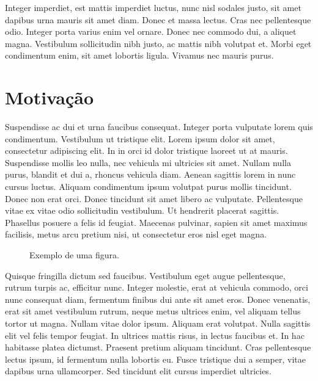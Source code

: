 Integer imperdiet, est mattis imperdiet luctus, nunc nisl sodales justo, sit amet dapibus urna mauris sit amet diam. Donec et massa lectus. Cras nec pellentesque odio. Integer porta varius enim vel ornare. Donec nec commodo dui, a aliquet magna. Vestibulum sollicitudin nibh justo, ac mattis nibh volutpat et. Morbi eget condimentum enim, sit amet lobortis ligula. Vivamus nec mauris purus.

\section{Motivação}


Suspendisse ac dui et urna faucibus consequat. Integer porta vulputate lorem quis condimentum. Vestibulum ut tristique elit. Lorem ipsum dolor sit amet, consectetur adipiscing elit. In in orci id dolor tristique laoreet ut at mauris. Suspendisse mollis leo nulla, nec vehicula mi ultricies sit amet. Nullam nulla purus, blandit et dui a, rhoncus vehicula diam. Aenean sagittis lorem in nunc cursus luctus. Aliquam condimentum ipsum volutpat purus mollis tincidunt. Donec non erat orci. Donec tincidunt sit amet libero ac vulputate. Pellentesque vitae ex vitae odio sollicitudin vestibulum. Ut hendrerit placerat sagittis. Phasellus posuere a felis id feugiat. Maecenas pulvinar, sapien sit amet maximus facilisis, metus arcu pretium nisi, ut consectetur eros nisl eget magna.

\begin{figure}
	\begin{center}
	\end{center}
	\caption{Exemplo de uma figura.}
\end{figure}

Quisque fringilla dictum  sed faucibus. Vestibulum eget augue pellentesque, rutrum turpis ac, efficitur nunc. Integer molestie, erat at vehicula commodo, orci nunc consequat diam, fermentum finibus dui ante sit amet eros. Donec venenatis, erat sit amet vestibulum rutrum, neque metus ultrices enim, vel aliquam tellus tortor ut magna. Nullam vitae dolor ipsum. Aliquam erat volutpat. Nulla sagittis elit vel felis tempor feugiat. In ultrices mattis risus, in  lectus faucibus et. In hac habitasse platea dictumst. Praesent pretium aliquam tincidunt. Cras pellentesque lectus ipsum, id fermentum nulla lobortis eu. Fusce tristique dui a  semper, vitae dapibus urna ullamcorper. Sed tincidunt elit cursus imperdiet ultricies.

